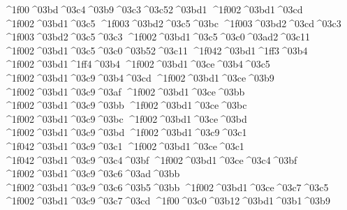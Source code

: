 {^^^^1f00^^^^03bd^^^^03c4^^^^03b9^^^^03c3^^^^03c52^^^^03bd1
^^^^1f002^^^^03bd1^^^^03cd   		%
^^^^1f002^^^^03bd1^^^^03c5
	^^^^1f003^^^^03bd2^^^^03c5^^^^03bc 		%
	^^^^1f003^^^^03bd2^^^^03cd^^^^03c3 		%
	^^^^1f003^^^^03bd2^^^^03c5^^^^03c3  		%
^^^^1f002^^^^03bd1^^^^03c5^^^^03c0^^^^03ad2^^^^03c11 		%
^^^^1f002^^^^03bd1^^^^03c5^^^^03c0^^^^03b52^^^^03c11
^^^^1f042^^^^03bd1^^^^1ff3^^^^03b4		%
^^^^1f002^^^^03bd1^^^^1ff4^^^^03b4
^^^^1f002^^^^03bd1^^^^03ce^^^^03b4^^^^03c5  	%
^^^^1f002^^^^03bd1^^^^03c9^^^^03b4^^^^03cd
^^^^1f002^^^^03bd1^^^^03ce^^^^03b9    		%
^^^^1f002^^^^03bd1^^^^03c9^^^^03af
^^^^1f002^^^^03bd1^^^^03ce^^^^03bb     		%
^^^^1f002^^^^03bd1^^^^03c9^^^^03bb
^^^^1f002^^^^03bd1^^^^03ce^^^^03bc 		%
^^^^1f002^^^^03bd1^^^^03c9^^^^03bc
^^^^1f002^^^^03bd1^^^^03ce^^^^03bd 		%
^^^^1f002^^^^03bd1^^^^03c9^^^^03bd
^^^^1f002^^^^03bd1^^^^03c9^^^^03c1  		%
^^^^1f042^^^^03bd1^^^^03c9^^^^03c1 		%
^^^^1f002^^^^03bd1^^^^03ce^^^^03c1
^^^^1f042^^^^03bd1^^^^03c9^^^^03c4^^^^03bf 		%
^^^^1f002^^^^03bd1^^^^03ce^^^^03c4^^^^03bf
^^^^1f002^^^^03bd1^^^^03c9^^^^03c6^^^^03ad^^^^03bb  		%
^^^^1f002^^^^03bd1^^^^03c9^^^^03c6^^^^03b5^^^^03bb   		%
^^^^1f002^^^^03bd1^^^^03ce^^^^03c7^^^^03c5 		%
^^^^1f002^^^^03bd1^^^^03c9^^^^03c7^^^^03cd
^^^^1f00^^^^03c0^^^^03b12^^^^03bd1^^^^03b1^^^^03b9 		%
}
